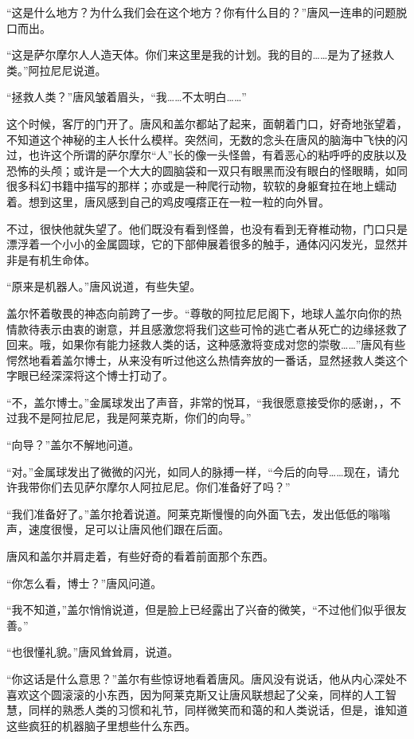 “这是什么地方？为什么我们会在这个地方？你有什么目的？”唐风一连串的问题脱口而出。

“这是萨尔摩尔人人造天体。你们来这里是我的计划。我的目的……是为了拯救人类。”阿拉尼尼说道。

“拯救人类？”唐风皱着眉头，“我……不太明白……”

这个时候，客厅的门开了。唐风和盖尔都站了起来，面朝着门口，好奇地张望着，不知道这个神秘的主人长什么模样。突然间，无数的念头在唐风的脑海中飞快的闪过，也许这个所谓的萨尔摩尔“人”长的像一头怪兽，有着恶心的粘呼呼的皮肤以及恐怖的头颅；或许是一个大大的圆脑袋和一双只有眼黑而没有眼白的怪眼睛，如同很多科幻书籍中描写的那样；亦或是一种爬行动物，软软的身躯耷拉在地上蠕动着。想到这里，唐风感到自己的鸡皮嘎瘩正在一粒一粒的向外冒。

不过，很快他就失望了。他们既没有看到怪兽，也没有看到无脊椎动物，门口只是漂浮着一个小小的金属圆球，它的下部伸展着很多的触手，通体闪闪发光，显然并非是有机生命体。

“原来是机器人。”唐风说道，有些失望。

盖尔怀着敬畏的神态向前跨了一步。“尊敬的阿拉尼尼阁下，地球人盖尔向你的热情款待表示由衷的谢意，并且感激您将我们这些可怜的逃亡者从死亡的边缘拯救了回来。哦，如果你有能力拯救人类的话，这种感激将变成对您的崇敬……”唐风有些愕然地看着盖尔博士，从来没有听过他这么热情奔放的一番话，显然拯救人类这个字眼已经深深将这个博士打动了。

“不，盖尔博士。”金属球发出了声音，非常的悦耳，“我很愿意接受你的感谢，，不过我不是阿拉尼尼，我是阿莱克斯，你们的向导。”

“向导？”盖尔不解地问道。

“对。”金属球发出了微微的闪光，如同人的脉搏一样，“今后的向导……现在，请允许我带你们去见萨尔摩尔人阿拉尼尼。你们准备好了吗？”

“我们准备好了。”盖尔抢着说道。阿莱克斯慢慢的向外面飞去，发出低低的嗡嗡声，速度很慢，足可以让唐风他们跟在后面。

唐风和盖尔并肩走着，有些好奇的看着前面那个东西。

“你怎么看，博士？”唐风问道。

“我不知道，”盖尔悄悄说道，但是脸上已经露出了兴奋的微笑，“不过他们似乎很友善。”

“也很懂礼貌。”唐风耸耸肩，说道。

“你这话是什么意思？”盖尔有些惊讶地看着唐风。唐风没有说话，他从内心深处不喜欢这个圆滚滚的小东西，因为阿莱克斯又让唐风联想起了父亲，同样的人工智慧，同样的熟悉人类的习惯和礼节，同样微笑而和蔼的和人类说话，但是，谁知道这些疯狂的机器脑子里想些什么东西。

